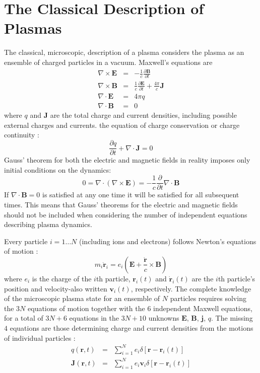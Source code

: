 \documentclass[12pt,a4paper]{article}
\renewcommand{\vec}[1]{\boldsymbol{#1}}
\begin{document}
\section{The Classical Description of Plasmas}
\cite{2015bps..book.....C} The classical, microscopic, description of a plasma considers the plasma as an ensemble of charged particles in a vacuum. Maxwell's equations are 
\begin{eqnarray*}
\nabla \times \vec{E} &=& -\frac{1}{c} \frac{\partial \vec{B}}{\partial t} \\
\nabla \times \vec{B} &=& \frac{1}{c} \frac{\partial \vec{E}}{\partial t} +\frac{4\pi}{c} \vec{J} \\
\nabla \cdot \vec{E} &=& 4\pi q \\
\nabla \cdot \vec{B} &=& 0
\end{eqnarray*}
where $q$ and $\vec{J}$ are the total charge and current densities, including possible external charges and currents. the equation of charge conservation or charge continuity :
\begin{equation*}
\frac{\partial q}{\partial t} + \nabla \cdot \vec{J} = 0
\end{equation*}
Gauss' theorem for both the electric and magnetic fields in reality imposes only initial conditions on the dynamics:
\begin{equation*}
0 = \nabla \cdot (\nabla \times \vec{E}) = -\frac{1}{c} \frac{\partial }{\partial t} \nabla \cdot \vec{B}
\end{equation*}
If $\nabla \cdot \vec{B} = 0$ is satisfied at any one time it will be satisfied for all subsequent times. This means that Gauss' theorems for the electric and magnetic fields should not be included when considering the number of independent equations describing plasma dynamics.

Every particle $i = 1 \ldots N$ (including ions and electrons) follows Newton’s equations of motion : 
\begin{equation}
m_i \ddot{\vec{r}}_i = e_i \left(\vec{E} +\frac{\dot{\vec{r}} }{c} \times \vec{B} \right)
\end{equation}
where $e_i$ is the charge of the $i$th particle, $\vec{r}_i(t)$ and $\dot{\vec{r}}_i(t)$ are the $i$th particle's position and velocity-also written $\vec{v}_i(t)$, respectively. The complete knowledge of the microscopic plasma state for an ensemble of $N$ particles requires solving the $3 N$ equations of motion together with the $6$ independent Maxwell equations, for a total of $3N+6$ equations in the $3N+10$ unknowns $\vec{E}$, $\vec{B}$, $\vec{j}$, $q$. The missing $4$ equations are those determining charge and current densities from the motions of individual particles :
\begin{eqnarray*}
q(\vec{r}, t) &=& \sum_{i=1}^N e_i \delta[\vec{r} - \vec{r}_i(t)] \\
\vec{J}(\vec{r}, t) &=& \sum_{i=1}^N e_i \vec{v}_i \delta[\vec{r} - \vec{r}_i(t)]
\end{eqnarray*}





\end{document}
